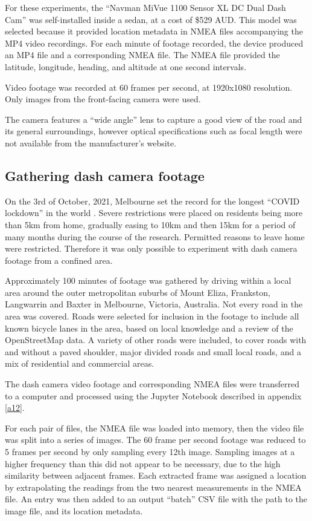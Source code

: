 \documentclass[11pt,twoside]{report}
\begin{document}
For these experiments, the ``Navman MiVue 1100 Sensor XL DC Dual Dash Cam'' was self-installed inside a sedan, at a cost of \$529 AUD.  This model was selected because it provided location metadata in NMEA files accompanying the MP4 video recordings.  For each minute of footage recorded, the device produced an MP4 file and a corresponding NMEA file.  The NMEA file provided the latitude, longitude, heading, and altitude at one second intervals.

Video footage was recorded at 60 frames per second, at 1920x1080 resolution.  Only images from the front-facing camera were used.

The camera features a ``wide angle'' lens to capture a good view of the road and its general surroundings, however optical specifications such as focal length were not available from the manufacturer's website.


\subsection{Gathering dash camera footage}
\label{s:rq3b}

On the 3rd of October, 2021, Melbourne set the record for the longest ``COVID lockdown'' in the world \cite{lockdown_record}.  Severe restrictions were placed on residents being more than 5km from home, gradually easing to 10km and then 15km for a period of many months during the course of the research\cite{lockdown_5km}.  Permitted reasons to leave home were restricted.  Therefore it was only possible to experiment with dash camera footage from a confined area.

Approximately 100 minutes of footage was gathered by driving within a local area around the outer metropolitan suburbs of Mount Eliza, Frankston, Langwarrin and Baxter in Melbourne, Victoria, Australia.  Not every road in the area was covered.  Roads were selected for inclusion in the footage to include all known bicycle lanes in the area, based on local knowledge and a review of the OpenStreetMap data.  A variety of other roads were included, to cover roads with and without a paved shoulder, major divided roads and small local roads, and a mix of residential and commercial areas.

The dash camera video footage and corresponding NMEA files were transferred to a computer and processed using the Jupyter Notebook described in appendix \ref{a12}.

For each pair of files, the NMEA file was loaded into memory, then the video file was split into a series of images.  The 60 frame per second footage was reduced to 5 frames per second by only sampling every 12th image.  Sampling images at a higher frequency than this did not appear to be necessary, due to the high similarity between adjacent frames.  Each extracted frame was assigned a location by extrapolating the readings from the two nearest measurements in the NMEA file.  An entry was then added to an output ``batch'' CSV file with the path to the image file, and its location metadata.
\end{document}
